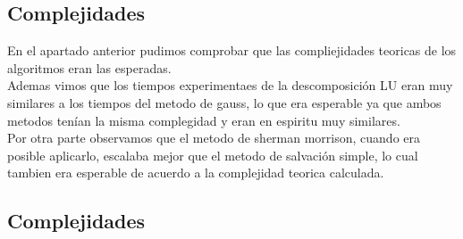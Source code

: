 \subsection{Complejidades}
En el apartado anterior pudimos comprobar que las compliejidades teoricas de los algoritmos eran las esperadas. 
\\
Ademas vimos que los tiempos experimentaes de la descomposición LU eran muy similares a los tiempos del metodo de gauss, lo que era esperable ya que ambos metodos tenían la misma complegidad y eran en espiritu muy similares.
\\
Por otra parte observamos que el metodo de sherman morrison, cuando era posible aplicarlo, escalaba mejor que el metodo de salvación simple, lo cual tambien era esperable de acuerdo a la complejidad teorica calculada.
\subsection{Complejidades}
\Completar